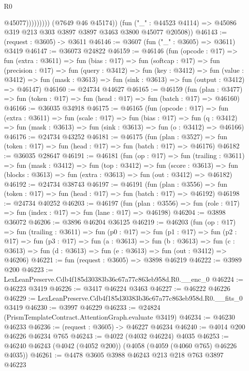 \begin{lexlean}{R0}
\begin{coremodule}
                          @45077)))))))))
        (@7649 @46 @45174))
      (fun ("_" : @44523 @4114) => @45086 @319 @213 @303 @3897 @3897 @3463 @3800 @45077 @20508))
@46143 := (request : @3605) -> @3611
@46146 := @3607 (fun ("_" : @3605) => @3611) @3419
@46147 := @36073 @24822
@46159 := @46146
    (fun (opcode : @17) =>
    fun (extra : @3611) =>
    fun (bias : @17) =>
    fun (softcap : @17) =>
    fun (precision : @17) =>
    fun (query : @3412) =>
    fun (key : @3412) =>
    fun (value : @3412) =>
    fun (mask : @3613) => fun (sink : @3613) => fun (output : @3412) => @46147)
@46160 := @24734 @44627
@46165 := @46159
    (fun (plan : @3477) => fun (token : @17) => fun (head : @17) => fun (batch : @17) => @46160)
@46166 := @36035 @34918
@46175 := @46165
    (fun (opcode : @17) =>
    fun (extra : @3611) =>
    fun (scale : @17) =>
    fun (bias : @17) =>
    fun (q : @3412) => fun (mask : @3613) => fun (sink : @3613) => fun (o : @3412) => @46166)
@46176 := @24734 @43252
@46181 := @46175
    (fun (plan : @3527) => fun (token : @17) => fun (head : @17) => fun (batch : @17) => @46176)
@46182 := @36035 @28647
@46191 := @46181
    (fun (op : @17) =>
    fun (trailing : @3611) =>
    fun (mask : @3412) =>
    fun (top : @3412) =>
    fun (score : @3613) =>
    fun (blocks : @3613) => fun (extra : @3613) => fun (out : @3412) => @46182)
@46192 := @24734 @38743
@46197 := @46191
    (fun (plan : @3556) => fun (token : @17) => fun (head : @17) => fun (batch : @17) => @46192)
@46198 := @24734 @40252
@46203 := @46197
    (fun (plan : @3556) => fun (role : @17) => fun (index : @17) => fun (lane : @17) => @46198)
@46204 := @3898 @36072
@46206 := @3896 @46204 @36125
@46219 := @46203
    (fun (op : @17) =>
    fun (trailing : @3611) =>
    fun (p0 : @17) =>
    fun (p1 : @17) =>
    fun (p2 : @17) =>
    fun (p3 : @17) =>
    fun (a : @3613) =>
    fun (b : @3613) =>
    fun (c : @3613) => fun (d : @3613) => fun (e : @3613) => fun (out : @3412) => @46206)
@46221 := fun (request : @3605) => @3898 @46219
@46222 := @3989 @200
@46223 := LexLeanPreserve.Cdb4f185d30383b36c67a77c863eb958d.R0.__enc_0
@46224 := @46223 @3419
@46226 := @3417 @46224 @3463
@46227 := @46222 @46226
@46229 := LexLeanPreserve.Cdb4f185d30383b36c67a77c863eb958d.R0.__fits_0 @3419
@46230 := @3997 @46229
@46233 := @24824 (PrismTemplateContract.AttentionGraph.evaluate @3419)
@46234 := @46230 @46233
@46236 := (request : @3605) -> @46227 @46234
@46240 := @4014 @200 @46226 @46234 @765
@46243 := @4022 (@4032 @46224) @4035
@46253 := @46240 @46243 (@4042 (@4052 @200)) (@4058 (@4059 (@4060 @765) @46226 @4035))
@46261 := @4478 @3605 @3988 @46243 @213 @218 @763 @3897 @46223

\end{coremodule}
\end{lexlean}
